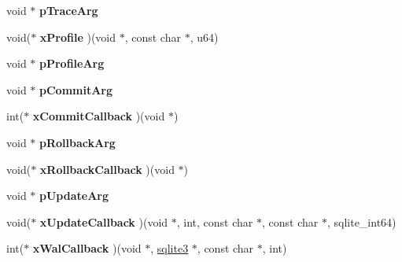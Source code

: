 \begin{DoxyCompactItemize}
\item 
\hypertarget{structsqlite3_ae0920576e4e92f1b736255fcfad649d1}{void $\ast$ {\bfseries p\-Trace\-Arg}}\label{structsqlite3_ae0920576e4e92f1b736255fcfad649d1}

\item 
\hypertarget{structsqlite3_aa02bf4f3ffdaf52d43a3668661903ffb}{void($\ast$ {\bfseries x\-Profile} )(void $\ast$, const char $\ast$, u64)}\label{structsqlite3_aa02bf4f3ffdaf52d43a3668661903ffb}

\item 
\hypertarget{structsqlite3_a931c234df9b701c78de38ddf22869062}{void $\ast$ {\bfseries p\-Profile\-Arg}}\label{structsqlite3_a931c234df9b701c78de38ddf22869062}

\item 
\hypertarget{structsqlite3_a355237725d3a535d702815b6ef8be75e}{void $\ast$ {\bfseries p\-Commit\-Arg}}\label{structsqlite3_a355237725d3a535d702815b6ef8be75e}

\item 
\hypertarget{structsqlite3_a1b12d797fb7f9c526ffb6665a7f42203}{int($\ast$ {\bfseries x\-Commit\-Callback} )(void $\ast$)}\label{structsqlite3_a1b12d797fb7f9c526ffb6665a7f42203}

\item 
\hypertarget{structsqlite3_a3215967241f15d4599132a8dc2adfb93}{void $\ast$ {\bfseries p\-Rollback\-Arg}}\label{structsqlite3_a3215967241f15d4599132a8dc2adfb93}

\item 
\hypertarget{structsqlite3_ad09cbc96e3c4e322c1722b8c16b9cf24}{void($\ast$ {\bfseries x\-Rollback\-Callback} )(void $\ast$)}\label{structsqlite3_ad09cbc96e3c4e322c1722b8c16b9cf24}

\item 
\hypertarget{structsqlite3_ab4269aa44fea9906fe94045336f13d2a}{void $\ast$ {\bfseries p\-Update\-Arg}}\label{structsqlite3_ab4269aa44fea9906fe94045336f13d2a}

\item 
\hypertarget{structsqlite3_a9177ce33e670ba38c97046e21482414a}{void($\ast$ {\bfseries x\-Update\-Callback} )(void $\ast$, int, const char $\ast$, const char $\ast$, sqlite\-\_\-int64)}\label{structsqlite3_a9177ce33e670ba38c97046e21482414a}

\item 
\hypertarget{structsqlite3_a895ca1f1d541060f1a43ac0267ab6437}{int($\ast$ {\bfseries x\-Wal\-Callback} )(void $\ast$, \hyperlink{structsqlite3}{sqlite3} $\ast$, const char $\ast$, int)}\label{structsqlite3_a895ca1f1d541060f1a43ac0267ab6437}


\end{DoxyCompactItemize}
